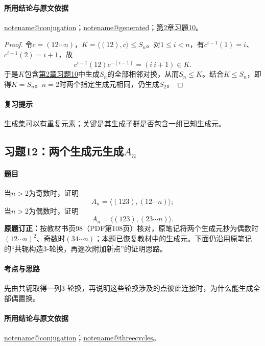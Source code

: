 \documentclass[UTF8,a4paper,11pt,fontset=windows]{ctexart}
\makeatletter
\newcommand{\noteref}[1]{\hyperref[note:#1]{\csname notename@#1\endcsname}}
\newcommand{\exref}[2]{\hyperref[ex:#1:#2]{第#1章习题#2}}
\makeatother
\begin{document}
\paragraph{所用结论与原文依据}
\noteref{conjugation}；\noteref{generated}；\exref{2}{10}。


\begin{proof}
令$c=(12\cdots n)$，$K=\langle(12),c\rangle\le S_n$。对$1\le i<n$，有$c^{i-1}(1)=i$、$c^{i-1}(2)=i+1$，故
\[
c^{i-1}(12)c^{-(i-1)}=(i\ i+1)\in K.
\]
于是$K$包含\exref{2}{10}中生成$S_n$的全部相邻对换，从而$S_n\le K$。结合$K\le S_n$，即得$K=S_n$。$n=2$时两个指定生成元相同，仍生成$S_2$。
\end{proof}

\paragraph{复习提示}
生成集可以有重复元素；关键是其生成子群是否包含一组已知生成元。


\subsection{习题12：\texorpdfstring{两个生成元生成$A_n$}{两个生成元生成An}}
\label{ex:2:12}

\paragraph{题目}
当$n>2$为奇数时，证明
\[
A_n=\langle(123),(12\cdots n)\rangle;
\]
当$n>2$为偶数时，证明
\[
A_n=\langle(123),(23\cdots n)\rangle.
\]
\textbf{原题订正：}按教材书页98（PDF第108页）核对，原笔记将两个生成元抄为偶数时$(12\cdots n)^2$、奇数时$(34\cdots n)$；本题已恢复教材中的生成元。下面仍沿用原笔记的“共轭构造3-轮换，再逐次附加新点”的证明思路。

\paragraph{考点与思路}
先由共轭取得一列3-轮换，再说明这些轮换涉及的点彼此连接时，为什么能生成全部偶置换。

\paragraph{所用结论与原文依据}
\noteref{conjugation}；\noteref{threecycles}。

\end{document}
